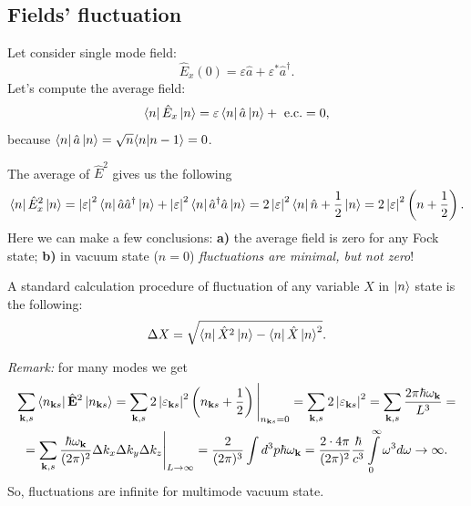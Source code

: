 	\subsection{Fields' fluctuation}
	
	Let consider single mode field:
	\begin{equation}
		\hat{E}_x(0) = \varepsilon \hat{a} + \varepsilon^* \hat{a}^{\dagger}.
	\end{equation}
	Let's compute the average field:
	\begin{equation}
		\left\langle {n} \right\rvert \hat{E}_x \left\lvert {n} \right\rangle = \varepsilon \left\langle {n} \right\rvert \hat{a} \left\lvert {n} \right\rangle + \text{ e.c.} = 0,
	\end{equation}
	because $\left\langle {n} \right\rvert \hat{a} \left\lvert {n} \right\rangle = \sqrt{n} \langle {n} \lvert {n-1} \rangle = 0$.
	
	The average of $\hat{E}^2$ gives us the following
	\begin{equation}
		\left\langle {n} \right\rvert \hat{E}^2_x \left\lvert {n} \right\rangle = \left| \varepsilon \right|^2 \left\langle {n} \right\rvert \hat{a} \hat{a}^{\dagger} \left\lvert {n} \right\rangle + \left| \varepsilon \right|^2 \left\langle {n} \right\rvert \hat{a}^{\dagger} \hat{a} \left\lvert {n} \right\rangle = 2 \left| \varepsilon \right|^2 \left\langle {n} \right\rvert \hat{n} + \frac{1}{2} \left\lvert {n} \right\rangle = 2 \left| \varepsilon \right|^2 \left( n + \frac{1}{2} \right).
	\end{equation}
	Here we can make a few conclusions: \textbf{a)} the average field is zero  for any Fock state; \textbf{b)} in vacuum state ($n=0$) \textit{fluctuations are minimal, but  not zero}!
	
	
	A standard calculation procedure of fluctuation of any variable $X$ in $\left\lvert {n} \right\rangle$ state is the following:
	\begin{equation}
		\Delta X = \sqrt{\left\langle {n} \right\rvert \hat{X}^2 \left\lvert {n} \right\rangle - \left\langle {n} \right\rvert \hat{X} \left\lvert {n} \right\rangle^2 }.
	\end{equation}
	
	\textit{Remark:} for many modes we get
	\begin{multline}
		\sum_{\mathbf{k},s} \left\langle {n_{\mathbf{k}s}} \right\rvert \hat{\mathbf{E}}^2 \left\lvert {n_{\mathbf{k}s}} \right\rangle = \sum_{\mathbf{k},s} 2 \left| \varepsilon_{\mathbf{k}s} \right|^2 \left( n_{\mathbf{k}s} + \frac{1}{2} \right) \Bigg|_{n_{\mathbf{k}s} = 0}  =  \sum_{\mathbf{k},s} 2 \left| \varepsilon_{\mathbf{k}s} \right|^2  =
		\sum_{\mathbf{k},s} \frac{2 \pi \hbar \omega_{\mathbf{k}}}{L^3} = \\ = \sum_{\mathbf{k},s} \frac{\hbar \omega_{\mathbf{k}}}{(2 \pi)^2} \Delta k_x \Delta k_y \Delta k_z \Bigg|_{L \to \infty} = \frac{2}{(2 \pi)^3} \int d^3 p \hbar \omega_{\mathbf{k}} = \frac{2 \cdot 4 \pi}{(2 \pi)^2} \frac{\hbar}{c^3} \int \limits_0^{\infty} \omega^3 d  \omega \to \infty.
	\end{multline}
So, fluctuations are infinite for multimode vacuum state.
	
